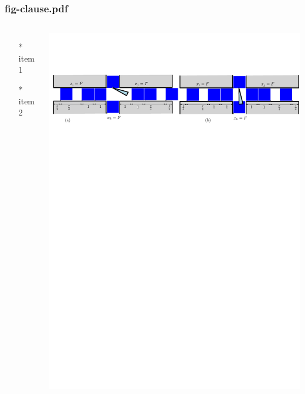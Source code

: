 \begin{frame} \frametitle{fig-clause.pdf}
    \begin{columns}[c]
        \begin{itemize}
            \item[*] item 1
            \item[*] item 2
        \end{itemize}
        \begin{minipage}{\linewidth}
            \begin{center}
            \includegraphics[width=.9\textwidth]{graphics/fig-clause.pdf}
            \label{gfx:fig-clause.pdf}
            \end{center}
        \end{minipage}
    \end{columns}
\end{frame}
